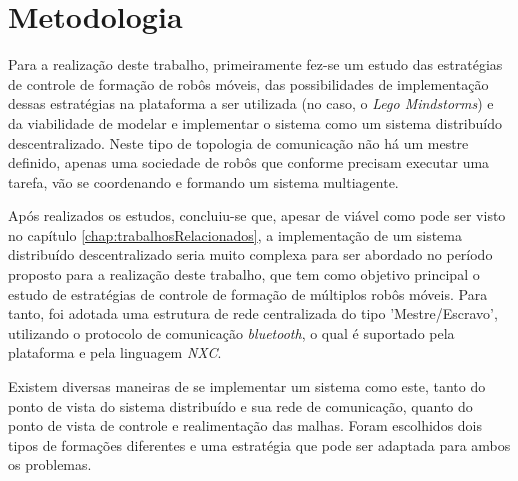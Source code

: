 %
%
\chapter{Metodologia}
\label{chap:Metod}
Para a realização deste trabalho, primeiramente fez-se um estudo das estratégias de controle de formação de robôs móveis, das possibilidades de implementação dessas estratégias na plataforma a ser utilizada (no caso, o \emph{Lego Mindstorms\textregistered}) e da viabilidade de modelar e implementar o sistema como um sistema distribuído descentralizado. Neste tipo de topologia de comunicação não há um mestre definido, apenas uma sociedade de robôs que conforme precisam executar uma tarefa, vão se coordenando e formando um sistema multiagente. 

Após realizados os estudos, concluiu-se que, apesar de viável como pode ser visto no capítulo \ref{chap:trabalhosRelacionados}, a implementação de um sistema distribuído descentralizado seria muito complexa para ser abordado no período proposto para a realização deste trabalho, que tem como objetivo principal o estudo de estratégias de controle de formação de múltiplos robôs móveis. Para tanto, foi adotada uma estrutura de rede centralizada do tipo 'Mestre/Escravo', utilizando o protocolo de comunicação \emph{bluetooth}, o qual é suportado pela plataforma e pela linguagem \emph{NXC}.%


Existem diversas maneiras de se implementar um sistema como este, tanto do ponto de vista do sistema distribuído e sua rede de comunicação, quanto do ponto de vista de controle e realimentação das malhas. Foram escolhidos dois tipos de formações diferentes e uma estratégia que pode ser adaptada para ambos os problemas. %

